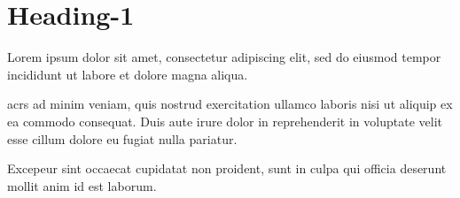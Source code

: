\section{Heading-1}
\label{heading-1}
Lorem ipsum dolor sit amet, consectetur adipiscing elit,
sed do eiusmod tempor incididunt ut labore et dolore magna
aliqua.

\acp{acr} ad minim veniam, quis nostrud exercitation
ullamco laboris nisi ut aliquip ex ea commodo consequat.
Duis aute irure dolor in reprehenderit in voluptate velit
esse cillum dolore eu fugiat nulla pariatur.

 Excepeur sint occaecat cupidatat non
proident, sunt in culpa qui officia deserunt mollit anim id
est laborum.
